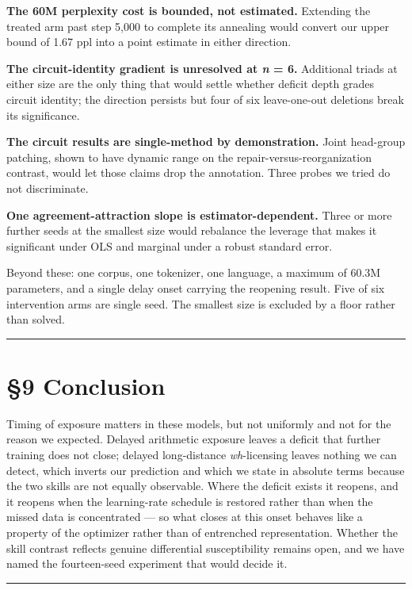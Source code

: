 \documentclass{article}
\begin{document}
\textbf{The 60M perplexity cost is bounded, not estimated.} Extending the treated arm past step
5,000 to complete its annealing would convert our upper bound of 1.67 ppl into a point
estimate in either direction.

\textbf{The circuit-identity gradient is unresolved at \emph{n} = 6.} Additional triads at either size
are the only thing that would settle whether deficit depth grades circuit identity; the
direction persists but four of six leave-one-out deletions break its significance.

\textbf{The circuit results are single-method by demonstration.} Joint head-group patching, shown
to have dynamic range on the repair-versus-reorganization contrast, would let those claims
drop the annotation. Three probes we tried do not discriminate.

\textbf{One agreement-attraction slope is estimator-dependent.} Three or more further seeds at the
smallest size would rebalance the leverage that makes it significant under OLS and marginal
under a robust standard error.

Beyond these: one corpus, one tokenizer, one language, a maximum of 60.3M parameters, and a
single delay onset carrying the reopening result. Five of six intervention arms are single
seed. The smallest size is excluded by a floor rather than solved.

\begin{center}\rule{0.5\linewidth}{0.5pt}\end{center}

\section{§9 Conclusion}\label{conclusion}

Timing of exposure matters in these models, but not uniformly and not for the reason we
expected. Delayed arithmetic exposure leaves a deficit that further training does not close;
delayed long-distance \emph{wh}-licensing leaves nothing we can detect, which inverts our
prediction and which we state in absolute terms because the two skills are not equally
observable. Where the deficit exists it reopens, and it reopens when the learning-rate
schedule is restored rather than when the missed data is concentrated --- so what closes at
this onset behaves like a property of the optimizer rather than of entrenched representation.
Whether the skill contrast reflects genuine differential susceptibility remains open, and we
have named the fourteen-seed experiment that would decide it.

\begin{center}\rule{0.5\linewidth}{0.5pt}\end{center}
\end{document}
